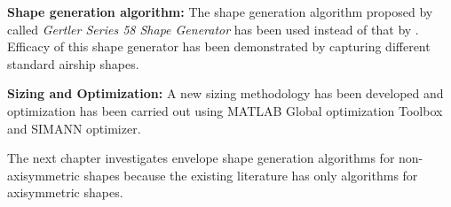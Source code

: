 \textbf{Shape generation algorithm:}
The shape generation algorithm proposed by \cite{gertler1950} called \textit{Gertler Series 58 Shape Generator} has been used instead of that by \cite{Wang2010}. Efficacy of this shape generator has been demonstrated by capturing different standard airship shapes. 

\textbf{Sizing and Optimization:} 
A new sizing methodology has been developed \cite{alam2014mdo} and optimization has been carried out using MATLAB Global optimization Toolbox and SIMANN optimizer.

The next chapter investigates envelope shape generation algorithms for non-axisymmetric shapes because the existing literature has only algorithms for axisymmetric shapes. 





